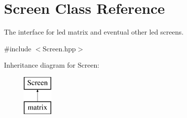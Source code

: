 \hypertarget{class_screen}{}\section{Screen Class Reference}
\label{class_screen}


The interface for led matrix and eventual other led screens.  




{\ttfamily \#include $<$Screen.\+hpp$>$}

Inheritance diagram for Screen\+:\begin{figure}[H]
\begin{center}
\leavevmode
\includegraphics[height=2.000000cm]{class_screen}
\end{center}
\end{figure}
